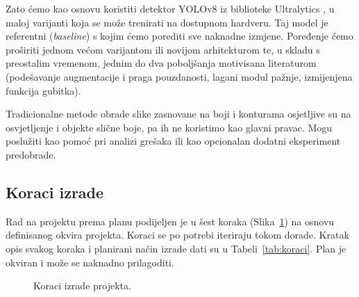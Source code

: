 Zato ćemo kao osnovu koristiti detektor YOLOv8 iz biblioteke Ultralytics \cite{jocher}, u maloj varijanti koja se može trenirati na dostupnom hardveru. Taj model je referentni (\emph{baseline}) s kojim ćemo porediti sve naknadne izmjene. Poređenje ćemo proširiti jednom većom varijantom ili novijom arhitekturom te, u skladu s preostalim vremenom, jednim do dva poboljšanja motivisana literaturom (podešavanje augmentacije i praga pouzdanosti, lagani modul pažnje, izmijenjena funkcija gubitka).

Tradicionalne metode obrade slike zasnovane na boji i konturama osjetljive su na osvjetljenje i objekte slične boje, pa ih ne koristimo kao glavni pravac. Mogu poslužiti kao pomoć pri analizi grešaka ili kao opcionalan dodatni eksperiment predobrade.

\subsection{Koraci izrade}
Rad na projektu prema planu podijeljen je u šest koraka (Slika~\ref{fig:koraci}) na osnovu definisanog okvira projekta. Koraci se po potrebi iteriraju tokom dorade. Kratak opis svakog koraka i planirani način izrade dati su u Tabeli~\ref{tab:koraci}. Plan je okviran i može se naknadno prilagoditi.

\begin{figure}[H]
\centering
{}
\caption{Koraci izrade projekta.}
\label{fig:koraci}
\end{figure}

